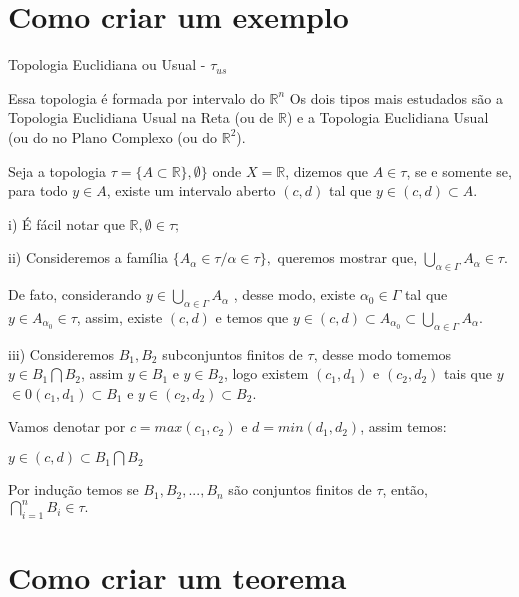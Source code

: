 \section{Como criar um exemplo}

\begin{ex}{Topologia Euclidiana ou Usual} - $\tau_{us}$

Essa topologia é formada por intervalo do $\mathbb{R}^{n}$
Os dois tipos mais estudados são a Topologia Euclidiana Usual na Reta (ou  de $\mathbb{R}$) e a Topologia Euclidiana Usual (ou do  no Plano Complexo (ou do $\mathbb{R}^{2}$).

Seja a topologia $\tau = \{A \subset \mathbb{R}\}, \emptyset\}$ onde $X = \mathbb{R}$, dizemos que $A \in \tau$, se e somente se, para todo $y \in A$, existe um intervalo aberto $(c,d)$ tal que
$y \in (c,d) \subset A.$

\item[i)] É fácil notar que $\mathbb{R}, \emptyset \in \tau;$

\item[ii)] Consideremos a família $\{A_{\alpha} \in \tau / \alpha \in\tau\},$
queremos mostrar que, $\bigcup\limits_{\alpha\in \Gamma} A_{\alpha}\in \tau.$

De fato, considerando $y \in \bigcup\limits_{\alpha\in \Gamma} A_{\alpha}$ ,
desse modo, existe $\alpha_{0} \in \Gamma$ tal que $y \in A_{\alpha_{0}} \in \tau$, assim, existe $(c,d)$ e
temos que $y\in (c,d) \subset A_{\alpha_{0}}\subset \bigcup\limits_{\alpha\in \Gamma}A_{\alpha}.$

\item[iii)] Consideremos $B_{1},B_{2}$ subconjuntos finitos de $\tau$, desse modo
tomemos $y \in B_{1}\bigcap B_{2}$, assim $y\in B_{1}$ e $y\in B_{2}$,
logo existem $(c_{1}, d_{1})$ e $(c_{2}, d_{2})$ tais que $y$
$\in0 (c_{1}, d_{1}) \subset B_{1}$ e $y\in (c_{2}, d_{2}) \subset B_{2}.$

Vamos denotar por $c = max(c_{1},c_{2})$ e $d = min(d_{1},d_{2})$, assim temos:

\begin{center}
 $y \in (c,d) \subset B_{1} \bigcap B_{2}$
\end{center}
 
Por indução temos  se $B_{1},B_{2},..., B_{n}$ são conjuntos finitos de $\tau$, então, $\bigcap\limits_{i=1}^{n}B_{i}\in\tau.$
\end{ex}

\section{Como criar um teorema}

